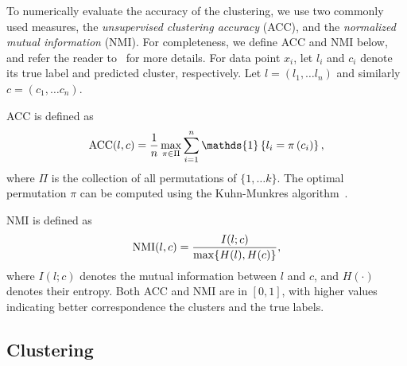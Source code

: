 \documentclass{article} %
\begin{document}

To numerically evaluate the accuracy of the clustering, we use two commonly used measures, the \emph{unsupervised clustering accuracy} (ACC), and the \emph{normalized mutual information} (NMI).
For completeness, we define ACC and NMI below, and refer the reader to~\citep{cai2011locally} for more details.
For data point $x_i$, let $l_i$ and $c_i$ denote its true label and predicted cluster, respectively.
Let $l = \left(l_1,\ldots l_n\right)$ and similarly $c = \left(c_1,\ldots c_n\right)$.

ACC is defined as
\begin{equation}
\text{ACC}(l,c) = \frac{1}{n}\max_{\pi \in \Pi}\sum_{i=1}^n \mathds{1}\left\{l_i=\pi\left(c_i\right)\right\},\notag
\end{equation}
where $\Pi$ is the collection of all permutations of $\{1,\ldots k\}$. The optimal permutation $\pi$ can be computed using the Kuhn-Munkres algorithm~\citep{munkres1957algorithms}.

NMI is defined as
\begin{equation}
\text{NMI}(l,c) = \frac{I(l;c)}{\max\{H(l),H(c)\}}, \notag
\end{equation}
where $I(l;c)$ denotes the mutual information between \(l\) and \(c\), and $H(\cdot)$ denotes their entropy.
Both ACC and NMI are in $[0,1]$, with higher values indicating better correspondence the clusters and the true labels.

\subsection {Clustering}
\end{document}
